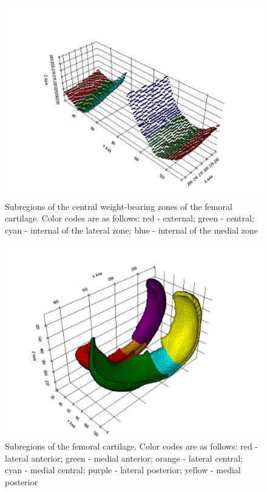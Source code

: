 \begin{figure}[]
	\centering
	\includegraphics[width=\linewidth]{./figures/cwbz_subregions}
	\caption{Subregions of the central weight-bearing zones of the femoral cartilage. Color codes are as follows: red - external; green - central; cyan - internal of the lateral zone; blue - internal of the medial zone}
	\label{fig:cwbz_subregions}
\end{figure}
\begin{figure}[]
	\centering
	\includegraphics[width=\linewidth]{./figures/femoral_subregions}
	\caption{Subregions of the femoral cartilage. Color codes are as follows: red - lateral anterior; green - medial anterior; orange - lateral central; cyan - medial central; purple - lateral posterior; yellow - medial posterior}
	\label{fig:femoral_subregions}
\end{figure}
